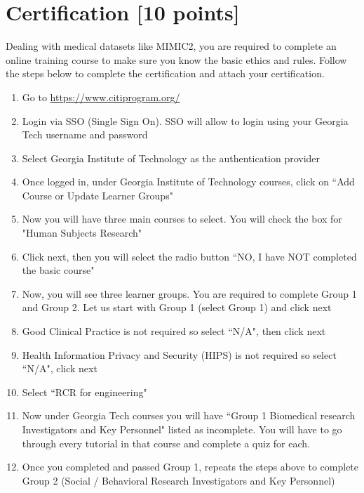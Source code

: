 \documentclass[12pt]{article}
\begin{document}
\section{Certification [10 points]}
Dealing with medical datasets like MIMIC2, you are required to complete an online training course to make sure you know the basic ethics and rules. Follow the steps below to complete the certification and attach your certification.
\begin{enumerate}[nolistsep]
\item Go to \url{https://www.citiprogram.org/}
\item Login via SSO (Single Sign On). SSO will allow to login using your Georgia Tech username and password
\item Select Georgia Institute of Technology as the authentication provider
\item Once logged in, under Georgia Institute of Technology courses, click on ``Add Course or Update Learner Groups"
\item Now you will have three main courses to select. You will check the box for "Human Subjects Research" 
\item Click next, then you will select the radio button ``NO, I have NOT completed the basic course"
\item Now, you will see three learner groups. You are required to complete Group 1 and Group 2. Let us start with Group 1 (select Group 1) and click next
\item Good Clinical Practice is not required so select ``N/A", then click next
\item Health Information Privacy and Security (HIPS) is not required so select ``N/A", click next
\item Select ``RCR for engineering"
\item Now under Georgia Tech courses you will have ``Group 1 Biomedical research Investigators and Key Personnel" listed as incomplete. You will have to go through every tutorial in that course and complete a quiz for each.
\item Once you completed and passed Group 1, repeats the steps above to complete Group 2 (Social / Behavioral Research Investigators and Key Personnel)
\end{enumerate}
\end{document}
